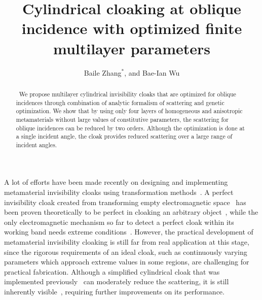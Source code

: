 \documentclass[12pt]{article} %
\begin{document}

\title{Cylindrical cloaking at oblique incidence with optimized finite multilayer parameters}



\author{Baile Zhang$^*$, and Bae-Ian Wu}

\address{
Research Laboratory of Electronics, Massachusetts
Institute of Technology, Cambridge, MA 02139, USA \\
$^*$Corresponding author: bzhang@mit.edu}

\begin{abstract}\ We propose multilayer cylindrical invisibility cloaks that are optimized for
oblique incidences through combination of analytic formalism of
scattering and genetic optimization. We show that by using only four
layers of homogeneous and anisotropic metamaterials without large
values of constitutive parameters, the scattering for oblique
incidences can be reduced by two orders. Although the optimization
is done at a single incident angle, the cloak provides reduced
scattering over a large range of incident angles.
\end{abstract}



\noindent

A lot of efforts have been made recently on designing and
implementing metamaterial invisibility cloaks using transformation
methods~\cite{pendry,leonhardt,cummer,hongsheng,baileprb,zhichao,schurig,wenshan,ying}.
A perfect invisibility cloak created from transforming empty
electromagnetic space~\cite{pendry} has been proven theoretically to
be perfect in cloaking an arbitrary object~\cite{hongsheng,
baileprb, zhichao}, while the only electromagnetic mechanism so far
to detect a perfect cloak within its working band needs extreme
conditions~\cite{baile_detection}. However, the practical
development of metamaterial invisibility cloaking is still far from
real application at this stage, since the rigorous requirements of
an ideal cloak, such as continuously varying parameters which
approach extreme values in some regions, are challenging for
practical fabrication. Although a simplified cylindrical cloak that
was implemented previously~\cite{schurig} can moderately reduce the
scattering, it is still inherently visible~\cite{minqiu_inherent},
requiring further improvements on its performance.
\end{document}

